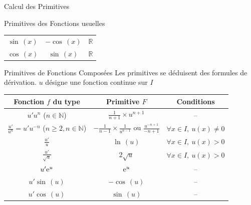 \documentclass{coursbook}
\begin{document}
\begin{Gpartie}{Calcul des Primitives}
\begin{Spartie}{Primitives des Fonctions usuelles}
\begin{table}[H]
\begin{tabular}[c]{ @{}*{3}{C}@{} }
                    $\sin\,(x)$                                   & $-\cos\,(x)$                                                        & $\mathbb{R}$ \\ 
                    $\cos\,(x)$                                   & $\sin\,(x)$                                                         & $\mathbb{R}$ \\ \bottomrule
                \end{tabular}
            \end{table}
        \end{Spartie}
        \begin{Spartie}{Primitives de Fonctions Composées}
            Les primitives se déduisent des formules de dérivation. $u$ désigne une fonction continue sur $I$ 
            \begin{table}[H] \centering {}
                \begin{tabular}[c]{ @{}*{3}{C}@{} } \toprule
                    Fonction $f$ du type                                    & Primitive $F$                                                             & Conditions  \\ \midrule
                    $u'u^n$ ($n\in\mathbb{N}$)                              & $\frac{1}{n+1}\times u^{n+1}$                                             & \---\\
                    $\frac{u'}{u^n}=u'u^{-n}$ ($n\geq2, n\in\mathbb{N}$)   & $-\frac{1}{n-1}\times\frac{1}{u^{n-1}}$ ou $\frac{u^{-n+1}}{-n+1}$        & $\forall x\in I,~u(x)\neq0$ \\
                    $\frac{u'}{u}$                                          & $\ln\,(u)$                                                                  & $\forall x\in I,~u(x)>0$ \\
                    $\frac{u'}{\sqrt{u}}$                                   & $2\sqrt{u}$                                                               & $\forall x\in I,~u(x)>0$ \\
                    $u'\mathrm{e}^u$                                                 & $\mathrm{e}^u$                                                                     & \---\\
                    $u'\sin\,(u)$                                             & $-\cos\,(u)$                                                                & \---\\
                    $u'\cos\,(u)$                                             & $\sin\,(u)$                                                                 & \---\\ \bottomrule

\end{tabular}
\end{table}
\end{Spartie}
\end{Gpartie}
\end{document}
